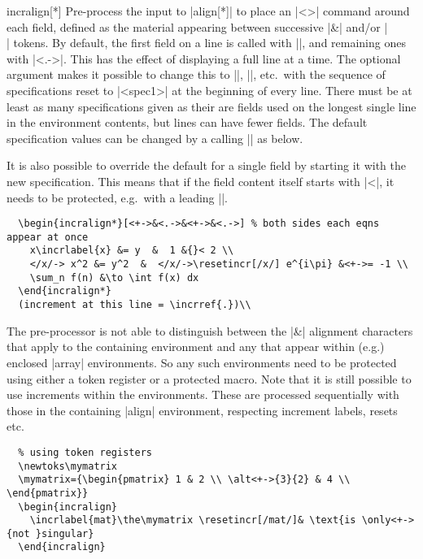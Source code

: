 \documentclass[a4paper]{ltxdoc}
\begin{document}
\begin{environment}{{incralign[*]}}
    Pre-process the input to |align[*]| to place an |\onslide<>{}| command
    around each field, defined as the material appearing between successive |&|
    and/or |\\| tokens.  By default, the first field on a line is called with
    |\onslide<+->{}|, and remaining ones with ||.  This has the
    effect of displaying a full line at a time.  The optional argument makes it
    possible to change this to ||, ||, etc.\ with
    the sequence of specifications reset to |<spec1>| at the beginning of every
    line. There must be at least as many specifications given as their are
    fields used on the longest single line in the environment contents, but
    lines can have fewer fields.  The default specification values can be
    changed by a calling |\incraligndefaultspec| as below.

    It is also possible to override the default for a single field by starting
    it with the new specification.  This means that if the field content itself
    starts with |<|, it needs to be protected, e.g.\ with a leading |{}|.

    \example
\begin{verbatim}
  \begin{incralign*}[<+->&<.->&<+->&<.->] % both sides each eqns appear at once
    x\incrlabel{x} &= y  &  1 &{}< 2 \\
    </x/-> x^2 &= y^2  &  </x/->\resetincr[/x/] e^{i\pi} &<+->= -1 \\
    \sum_n f(n) &\to \int f(x) dx
  \end{incralign*}
  (increment at this line = \incrref{.})\\
\end{verbatim}
    
    The pre-processor is not able to distinguish between the |&| alignment
    characters that apply to the containing environment and any that appear
    within (e.g.) enclosed |array| environments.  So any such environments need
    to be protected using either a token register or a protected macro.  Note
    that it is still possible to use increments within the environments. These
    are processed sequentially with those in the containing |align| environment,
    respecting increment labels, resets etc.

    \example
\begin{verbatim}
  % using token registers
  \newtoks\mymatrix
  \mymatrix={\begin{pmatrix} 1 & 2 \\ \alt<+->{3}{2} & 4 \\ \end{pmatrix}}
  \begin{incralign}
    \incrlabel{mat}\the\mymatrix \resetincr[/mat/]& \text{is \only<+->{not }singular}
  \end{incralign}


\end{verbatim}
\end{environment}
\end{document}
